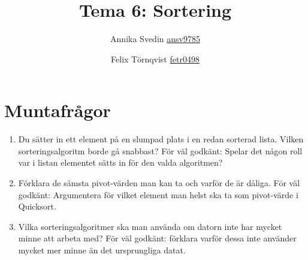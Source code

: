 \documentclass[a5paper,10pt,oneside]{article}
\title{Tema 6: Sortering}
\author{Annika Svedin \url{ansv9785} \and Felix Törnqvist \url{fetr0498}}
\begin{document}
\maketitle

\section*{Muntafrågor}

\begin{enumerate}

	\item Du sätter in ett element på en slumpad plats i en redan sorterad lista. Vilken sorteringsalgoritm borde gå snabbast?
		För väl godkänt: Spelar det någon roll var i listan elementet sätts in för den valda algoritmen?
	
	
	\item Förklara de sämsta pivot-värden man kan ta och varför de är dåliga. För väl godkänt:  Argumentera för vilket element man helst ska ta som pivot-värde i Quicksort.
	
	\item Vilka sorteringsalgoritmer ska man använda om datorn inte har mycket minne att arbeta med? För väl godkänt: förklara varför dessa inte använder mycket mer minne än det ursprungliga datat.
\end{enumerate}
\end{document}
